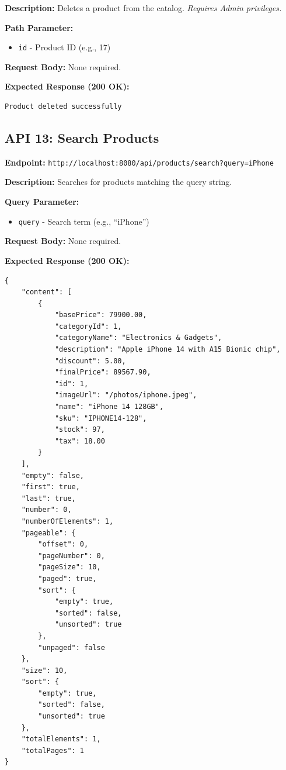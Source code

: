 \documentclass[12pt, a4paper]{article}
\begin{document}
\textbf{Description:} Deletes a product from the catalog. \textit{Requires Admin privileges.}

\textbf{Path Parameter:}
\begin{itemize}
    \item \texttt{id} - Product ID (e.g., 17)
\end{itemize}

\textbf{Request Body:} None required.

\textbf{Expected Response (200 OK):}
\begin{lstlisting}
Product deleted successfully
\end{lstlisting}

\vspace{0.5cm}

\subsection{API 13: Search Products}

\begin{tcolorbox}[colback=getcolor!10, colframe=getcolor, title=GET]
\textbf{Endpoint:} \texttt{http://localhost:8080/api/products/search?query=iPhone}
\end{tcolorbox}

\textbf{Description:} Searches for products matching the query string.

\textbf{Query Parameter:}
\begin{itemize}
    \item \texttt{query} - Search term (e.g., ``iPhone'')
\end{itemize}

\textbf{Request Body:} None required.

\textbf{Expected Response (200 OK):}
\begin{lstlisting}
{
    "content": [
        {
            "basePrice": 79900.00,
            "categoryId": 1,
            "categoryName": "Electronics & Gadgets",
            "description": "Apple iPhone 14 with A15 Bionic chip",
            "discount": 5.00,
            "finalPrice": 89567.90,
            "id": 1,
            "imageUrl": "/photos/iphone.jpeg",
            "name": "iPhone 14 128GB",
            "sku": "IPHONE14-128",
            "stock": 97,
            "tax": 18.00
        }
    ],
    "empty": false,
    "first": true,
    "last": true,
    "number": 0,
    "numberOfElements": 1,
    "pageable": {
        "offset": 0,
        "pageNumber": 0,
        "pageSize": 10,
        "paged": true,
        "sort": {
            "empty": true,
            "sorted": false,
            "unsorted": true
        },
        "unpaged": false
    },
    "size": 10,
    "sort": {
        "empty": true,
        "sorted": false,
        "unsorted": true
    },
    "totalElements": 1,
    "totalPages": 1
}
\end{lstlisting}
\end{document}
